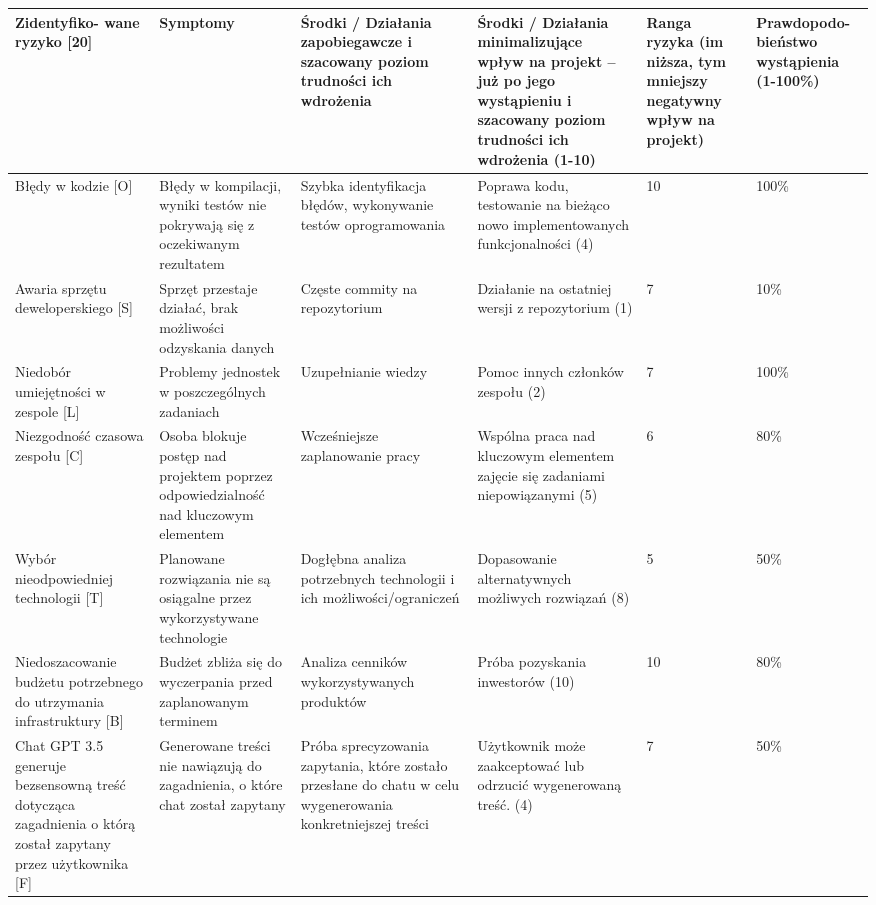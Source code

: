 \begin{tabular}{|p{2.3cm}|p{2.3cm}|p{2.3cm}|p{2.3cm}|p{2.3cm}|p{2.3cm}|}
\hline
\textbf{Zidentyfiko- wane ryzyko [20]} & \textbf{Symptomy} & \textbf{Środki / Działania zapobiegawcze i szacowany poziom trudności ich wdrożenia} & \textbf{Środki / Działania minimalizujące wpływ na projekt – już po jego wystąpieniu i szacowany poziom trudności ich wdrożenia (1-10)} & \textbf{Ranga ryzyka (im niższa, tym mniejszy negatywny wpływ na projekt)} & \textbf{Prawdopodo- bieństwo wystąpienia (1-100\%)} \\
\hline
Błędy w kodzie [O] & Błędy w kompilacji, wyniki testów nie pokrywają się z oczekiwanym rezultatem  & Szybka identyfikacja błędów, wykonywanie testów oprogramowania & Poprawa kodu, testowanie na bieżąco nowo implementowanych funkcjonalności (4) & 10 & 100\% \\
\hline
Awaria sprzętu deweloperskiego [S] & Sprzęt przestaje działać, brak możliwości odzyskania danych & Częste commity na repozytorium & Działanie na ostatniej wersji z repozytorium (1) & 7 & 10\% \\
\hline
Niedobór umiejętności w zespole [L] & Problemy jednostek w poszczególnych zadaniach & Uzupełnianie wiedzy & Pomoc innych członków zespołu (2) & 7 & 100\% \\
\hline
Niezgodność czasowa zespołu [C]  & Osoba blokuje postęp nad projektem poprzez odpowiedzialność nad kluczowym elementem & Wcześniejsze zaplanowanie pracy & Wspólna praca nad kluczowym elementem zajęcie się zadaniami niepowiązanymi (5) & 6 & 80\% \\
\hline
Wybór nieodpowiedniej technologii [T] & Planowane rozwiązania nie są osiągalne przez wykorzystywane technologie & Dogłębna analiza potrzebnych technologii i ich możliwości/ograniczeń & Dopasowanie alternatywnych możliwych rozwiązań (8) & 5 & 50\% \\
\hline
Niedoszacowanie budżetu potrzebnego do utrzymania infrastruktury [B] & Budżet zbliża się do wyczerpania przed zaplanowanym terminem  & Analiza cenników wykorzystywanych produktów & Próba pozyskania inwestorów (10) & 10 & 80\% \\
\hline
Chat GPT 3.5 generuje bezsensowną treść dotycząca zagadnienia o którą został zapytany przez użytkownika [F] & Generowane treści nie nawiązują do zagadnienia, o które chat został zapytany & Próba sprecyzowania zapytania, które zostało przesłane do chatu w celu wygenerowania konkretniejszej treści & Użytkownik może zaakceptować lub odrzucić wygenerowaną treść.  (4) & 7 & 50\% \\
\hline
\end{tabular}